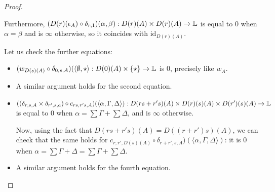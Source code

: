 \begin{proof}
\begin{itemize}
Furthermore, 
$(D(r)(\epsilon_{A})\circ \delta_{r,1})( \alpha,\beta ):
D(r)(A) \times D(r)(A)\to \mathbb{L}
$ is equal to $0$ when $\alpha=\beta$ and is $\infty$ otherwise, so it coincides with $\mathrm{id}_{D(r)(A)}$.


\end{itemize}


Let us check the further equations:
\begin{itemize}

\item $(w_{D(s)(A)}\circ \delta_{0,s,A})(\langle \emptyset,\star\rangle: D(0)(A)\times \{\star\}\to \mathbb{L}$ is 0, precisely like $w_{A}$.

\item A similar argument holds for the second equation.

\item $((\delta_{r,s,A}\times \delta_{r',s,a})\circ c_{rs,r's,A})
(\langle \alpha, \Gamma,\Delta  \rangle)
:
D(rs+r's)(A)\times  D(r)(s)(A)\times D(r')(s)(A)\to \mathbb{L}
$
is equal to $0$ when $\alpha=\sum \Gamma + \sum \Delta$, and is $\infty$ otherwise.



Now, 
using the fact that $D(rs+r's)(A)=D((r+r')s)(A)$, we can check that the same holds for 
$c_{r,r',D(s)(A)}\circ \delta_{r+r',s,A})(\langle \alpha, \Gamma,\Delta  \rangle)$: it is $0$ when 
$\alpha= \sum\Gamma+\Delta= \sum \Gamma+\sum \Delta$.


\item A similar argument holds for the fourth equation.

\end{itemize}
\end{proof}
